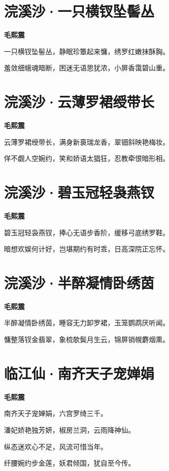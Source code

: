 \documentclass[12pt,a4paper]{ctexbook}
\begin{document}
\section{浣溪沙·一只横钗坠髻丛}
\textbf{毛熙震}\par\vspace{0.5em}
一只横钗坠髻丛，静眠珍簟起来慵，绣罗红嫩抹酥胸。\par
羞敛细蛾魂暗断，困迷无语思犹浓，小屏香霭碧山重。\par

\section{浣溪沙·云薄罗裙绶带长}
\textbf{毛熙震}\par\vspace{0.5em}
云薄罗裙绶带长，满身新裛瑞龙香，翠钿斜映艳梅妆。\par
佯不觑人空婉约，笑和娇语太猖狂，忍教牵恨暗形相。\par

\section{浣溪沙·碧玉冠轻袅燕钗}
\textbf{毛熙震}\par\vspace{0.5em}
碧玉冠轻袅燕钗，捧心无语步香阶，缓移弓底绣罗鞋。\par
暗想欢娱何计好，岂堪期约有时乖，日高深院正忘怀。\par

\section{浣溪沙·半醉凝情卧绣茵}
\textbf{毛熙震}\par\vspace{0.5em}
半醉凝情卧绣茵，睡容无力卸罗裙，玉笼鹦鹉厌听闻。\par
慵整落钗金翡翠，象梳欹鬓月生云，锦屏销幌麝烟熏。\par

\section{临江仙·南齐天子宠婵娟}
\textbf{毛熙震}\par\vspace{0.5em}
南齐天子宠婵娟，六宫罗绮三千。\par
潘妃娇艳独芳妍，椒房兰洞，云雨降神仙。\par
纵态迷欢心不足，风流可惜当年。\par
纤腰婉约步金莲，妖君倾国，犹自至今传。\par
\end{document}
